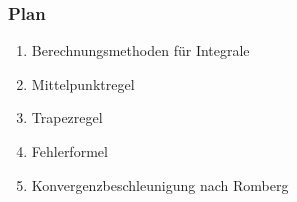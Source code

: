 %
%
%
\begin{frame}
\frametitle{Plan}
\begin{enumerate}
\item<2->
Berechnungsmethoden für Integrale
\item<3->
Mittelpunktregel
\item<4->
Trapezregel
\item<5->
Fehlerformel
\item<6->
Konvergenzbeschleunigung nach Romberg
\end{enumerate}

\end{frame}
